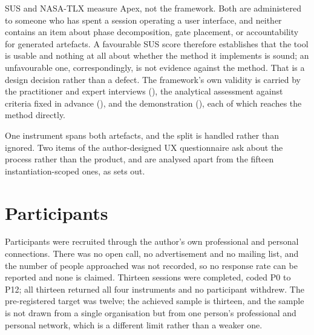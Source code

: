 
\ac{SUS} and \ac{NASA-TLX} measure Apex, not the framework. Both are administered to someone who has spent a session operating a user interface, and neither contains an item about phase decomposition, gate placement, or accountability for generated artefacts. A favourable \ac{SUS} score therefore establishes that the tool is usable and nothing at all about whether the method it implements is sound; an unfavourable one, correspondingly, is not evidence against the method. That is a design decision rather than a defect. The framework's own validity is carried by the practitioner and expert interviews (), the analytical assessment against criteria fixed in advance (), and the demonstration (), each of which reaches the method directly.

One instrument spans both artefacts, and the split is handled rather than ignored. Two items of the author-designed \ac{UX} questionnaire ask about the process rather than the product, and are analysed apart from the fifteen instantiation-scoped ones, as  sets out.

\section{Participants}
\label{sec:eval_participants}

Participants were recruited through the author's own professional and personal connections. There was no open call, no advertisement and no mailing list, and the number of people approached was not recorded, so no response rate can be reported and none is claimed. Thirteen sessions were completed, coded P0 to P12; all thirteen returned all four instruments and no participant withdrew. The pre-registered target was twelve; the achieved sample is thirteen, and the sample is not drawn from a single organisation but from one person's professional and personal network, which is a different limit rather than a weaker one.

